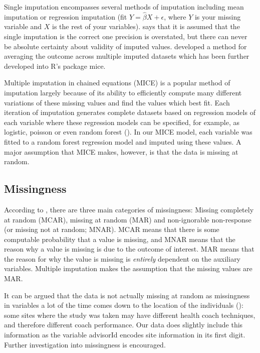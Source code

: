 \documentclass[12pt]{article}
\begin{document}
	Single imputation encompasses several methods of imputation including mean imputation or regression imputation (fit $Y= \widehat\beta X + \epsilon$, where $Y$ is your missing variable and $X$ is the rest of your variables). \cite{jadhav1} says that it is assumed that the single imputation is the correct one precision is overstated, but there can never be absolute certainty about validity of imputed values. \cite{rubin1} developed a method for averaging the outcome across multiple imputed datasets which has been further developed into \textsf{R}'s package \textsf{mice}.
	
	Multiple imputation in chained equations (MICE) is a popular method of imputation largely because of its ability to efficiently compute many different variations of these missing values and find the values which best fit. Each iteration of imputation generates complete datasets based on regression models of each variable where these regression models can be specified, for example, as logistic, poisson or even random forest (\cite{mice1}). In our MICE model, each variable was fitted to a random forest regression model and imputed using these values. A major assumption that MICE makes, however, is that the data is missing at random.
	
	\subsection{Missingness}
	
	According to \cite{rarnorld1}, there are three main categories of missingness: Missing completely at random (MCAR), missing at random (MAR) and non-ignorable non-response (or missing not at random; MNAR). MCAR means that there is some computable probability that a value is missing, and MNAR means that the reason why a value is missing is due to the outcome of interest. MAR means that the reason for why the value is missing is \emph{entirely} dependent on the auxiliary variables. Multiple imputation makes the assumption that the missing values are MAR.
	
	It can be argued that the data is not actually missing at random as missingness in variables a lot of the time comes down to the location of the individuals (\cite{kangh1}): some sites where the study was taken may have different health coach techniques, and therefore different coach performance. Our data does slightly include this information as the variable \textsf{advisorId} encodes site information in its first digit. Further investigation into missingness is encouraged.
\end{document}
